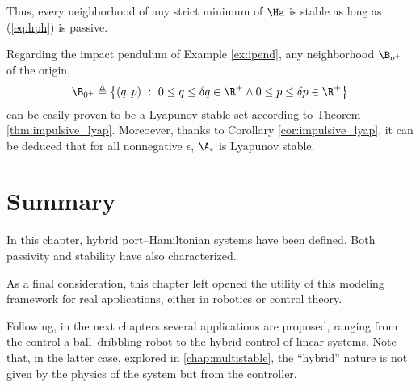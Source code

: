 %
Thus, every neighborhood of any strict minimum of $\Ha$ is stable as long as (\ref{eq:hph}) is passive.
%
\begin{rem}
    Regarding the impact pendulum of Example \ref{ex:ipend}, any neighborhood $\B_{o^+}$ of the origin,
    \begin{equation}
        \B_{0^+}\triangleq \left\{(q,p)~:~0\leq q\leq\delta q\in\R^+\land0\leq p\leq\delta p\in\R^+\right\}
    \end{equation}
    can be easily proven to be a Lyapunov stable set according to Theorem \ref{thm:impulsive_lyap}. Moreoever, thanks to Corollary \ref{cor:impulsive_lyap}, it can be deduced that for all nonnegative $\epsilon$, $\A_\epsilon$ is Lyapunov stable.
\end{rem}
%
\clearpage
\section{Summary}
%
In this chapter, hybrid port--Hamiltonian systems have been defined. Both passivity and stability have also characterized.
%
\newline

%
As a final consideration, this chapter left opened the utility of this modeling framework for real applications, either in robotics or control theory.
%
\newline

%
Following, in the next chapters several applications are proposed, ranging from the control a ball--dribbling robot to the hybrid control of linear systems. Note that, in the latter case, explored in \ref{chap:multistable}, the ``hybrid'' nature is not given by the physics of the system but from the controller.
%